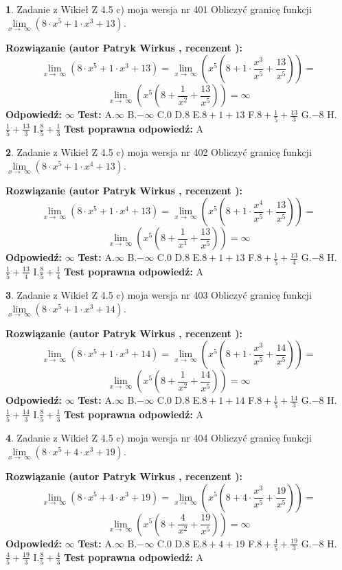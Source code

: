 \documentclass[12pt, a4paper]{article}
\theoremstyle{definition} %
\newtheorem{zad}{}
\newcommand{\zadStart}[1]{\begin{zad}#1\newline}
\newcommand{\zadStop}{\end{zad}}
\newcommand{\rozwStart}[2]{\noindent \textbf{Rozwiązanie (autor #1 , recenzent #2): }\newline}
\newcommand{\rozwStop}{\newline}
\newcommand{\odpStart}{\noindent \textbf{Odpowiedź:}\newline}
\newcommand{\odpStop}{\newline}
\newcommand{\testStart}{\noindent \textbf{Test:}\newline}
\newcommand{\testStop}{\newline}
\newcommand{\kluczStart}{\noindent \textbf{Test poprawna odpowiedź:}\newline}
\newcommand{\kluczStop}{\newline}
\begin{document}
\zadStart{Zadanie z Wikieł Z 4.5 c) moja wersja nr 401}
Obliczyć granicę funkcji  $\lim\limits_{x\to\ \infty}(8 \cdot x^{5}+1 \cdot x^{3}+13)$.
\zadStop
\rozwStart{Patryk Wirkus}{}
$$\lim\limits_{x\to\ \infty}(8 \cdot x^{5}+1 \cdot x^{3}+13) = \lim\limits_{x\to\ \infty}(x^{5}(8 +1 \cdot \frac{x^{3}}{x^{5}}+\frac{13}{x^{5}})) =$$ $$\lim\limits_{x\to\ \infty}(x^{5}(8 +\frac{1}{x^{2}}+\frac{13}{x^{5}})) =\infty$$
\rozwStop
\odpStart
$\infty$
\odpStop
\testStart
A.$\infty$ B.$-\infty$ C.$0$ D.$8$ E.$8 + 1 + 13$
F.$8+\frac{1}{5}+\frac{13}{3}$ G.$-8$
H.$\frac{1}{5}+\frac{13}{3}$
I.$\frac{8}{5}+\frac{1}{3}$
\testStop
\kluczStart
A
\kluczStop



\zadStart{Zadanie z Wikieł Z 4.5 c) moja wersja nr 402}
Obliczyć granicę funkcji  $\lim\limits_{x\to\ \infty}(8 \cdot x^{5}+1 \cdot x^{4}+13)$.
\zadStop
\rozwStart{Patryk Wirkus}{}
$$\lim\limits_{x\to\ \infty}(8 \cdot x^{5}+1 \cdot x^{4}+13) = \lim\limits_{x\to\ \infty}(x^{5}(8 +1 \cdot \frac{x^{4}}{x^{5}}+\frac{13}{x^{5}})) =$$ $$\lim\limits_{x\to\ \infty}(x^{5}(8 +\frac{1}{x^{1}}+\frac{13}{x^{5}})) =\infty$$
\rozwStop
\odpStart
$\infty$
\odpStop
\testStart
A.$\infty$ B.$-\infty$ C.$0$ D.$8$ E.$8 + 1 + 13$
F.$8+\frac{1}{5}+\frac{13}{4}$ G.$-8$
H.$\frac{1}{5}+\frac{13}{4}$
I.$\frac{8}{5}+\frac{1}{4}$
\testStop
\kluczStart
A
\kluczStop



\zadStart{Zadanie z Wikieł Z 4.5 c) moja wersja nr 403}
Obliczyć granicę funkcji  $\lim\limits_{x\to\ \infty}(8 \cdot x^{5}+1 \cdot x^{3}+14)$.
\zadStop
\rozwStart{Patryk Wirkus}{}
$$\lim\limits_{x\to\ \infty}(8 \cdot x^{5}+1 \cdot x^{3}+14) = \lim\limits_{x\to\ \infty}(x^{5}(8 +1 \cdot \frac{x^{3}}{x^{5}}+\frac{14}{x^{5}})) =$$ $$\lim\limits_{x\to\ \infty}(x^{5}(8 +\frac{1}{x^{2}}+\frac{14}{x^{5}})) =\infty$$
\rozwStop
\odpStart
$\infty$
\odpStop
\testStart
A.$\infty$ B.$-\infty$ C.$0$ D.$8$ E.$8 + 1 + 14$
F.$8+\frac{1}{5}+\frac{14}{3}$ G.$-8$
H.$\frac{1}{5}+\frac{14}{3}$
I.$\frac{8}{5}+\frac{1}{3}$
\testStop
\kluczStart
A
\kluczStop



\zadStart{Zadanie z Wikieł Z 4.5 c) moja wersja nr 404}
Obliczyć granicę funkcji  $\lim\limits_{x\to\ \infty}(8 \cdot x^{5}+4 \cdot x^{3}+19)$.
\zadStop
\rozwStart{Patryk Wirkus}{}
$$\lim\limits_{x\to\ \infty}(8 \cdot x^{5}+4 \cdot x^{3}+19) = \lim\limits_{x\to\ \infty}(x^{5}(8 +4 \cdot \frac{x^{3}}{x^{5}}+\frac{19}{x^{5}})) =$$ $$\lim\limits_{x\to\ \infty}(x^{5}(8 +\frac{4}{x^{2}}+\frac{19}{x^{5}})) =\infty$$
\rozwStop
\odpStart
$\infty$
\odpStop
\testStart
A.$\infty$ B.$-\infty$ C.$0$ D.$8$ E.$8 + 4 + 19$
F.$8+\frac{4}{5}+\frac{19}{3}$ G.$-8$
H.$\frac{4}{5}+\frac{19}{3}$
I.$\frac{8}{5}+\frac{4}{3}$
\testStop
\kluczStart
A
\kluczStop
\end{document}
